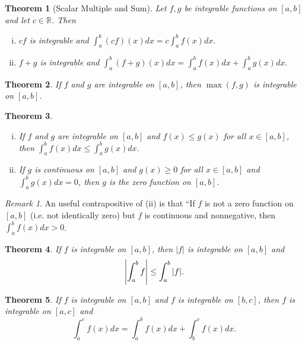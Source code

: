 \documentclass[12pt, lettersize]{book}
\theoremstyle{plain}
\newtheorem{thm}{Theorem}[section]
\theoremstyle{definition}
\theoremstyle{remark}
\newtheorem*{rem}{Remark}
\newcommand{\R}{\mathbb{R}}
\begin{document}
			\begin{thm}[Scalar Multiple and Sum]
				Let $f,g$ be integrable functions on $[a,b]$ and let $c\in\R$. Then
				\begin{enumerate}[(i)]
					\item $cf$ is integrable and $\int_{a}^{b}(cf)(x)dx=c\int_{a}^{b}f(x)dx.$
					\item $f+g$ is integrable and $\int_{a}^{b}(f+g)(x)dx=\int_{a}^{b}f(x)dx+\int_{a}^{b}g(x)dx.$
				\end{enumerate}
			\end{thm}
			
			\begin{thm}
				If $f$ and $g$ are integrable on $[a,b]$, then $\max(f,g)$ is integrable on $[a,b]$.
			\end{thm}
			
			\begin{thm}
			\begin{enumerate}[(i)]
				\item If $f$ and $g$ are integrable on $[a,b]$ and $f(x)\leq g(x)$ for all $x\in[a,b]$, then $\int_{a}^{b}f(x)dx\leq\int_{a}^{b}g(x)dx$.
				\item If $g$ is continuous on $[a,b]$ and $g(x)\geq 0$ for all $x\in[a,b]$ and $\int_{a}^{b}g(x)dx=0$, then $g$ is the zero function on $[a,b]$.
			\end{enumerate}
			\end{thm}
			\begin{rem}
				An useful contrapositive of (ii) is that ``If $f$ is not a zero function on $[a,b]$ (i.e. not identically zero) but $f$ is continuous and nonnegative, then $\int_{a}^{b}f(x)dx>0$.  
			\end{rem}
			
			\begin{thm}
			If $f$ is integrable on $[a,b]$, then $|f|$ is integrable on $[a,b]$ and
			\begin{displaymath}
				\abs{\int_{a}^{b}f}\leq\int_{a}^{b}\abs{f}.
			\end{displaymath}
			\end{thm}
			
			\begin{thm}
			If $f$ is integrable on $[a,b]$ and $f$ is integrable on $[b,c]$, then $f$ is integrable on $[a,c]$ and 
			\begin{displaymath}
				\int_{a}^{c}f(x)dx=\int_{a}^{b}f(x)dx+\int_{b}^{c}f(x)dx.
			\end{displaymath}
			\end{thm}
			
\end{document}
